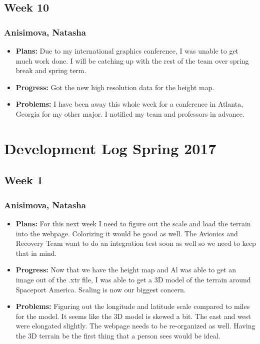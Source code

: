 \documentclass[10pt,draftclsnofoot,onecolumn]{IEEEtran}
\begin{document}
\subsection{Week 10}
\subsubsection{Anisimova, Natasha}
\begin{itemize}
	\item \textbf{Plans: }
	Due to my international graphics conference, I was unable to get much work done. I will be catching up with the rest of the team over spring break and spring term.
	\item \textbf{Progress: }
	Got the new high resolution data for the height map.

	\item \textbf{Problems: }
	I have been away this whole week for a conference in Atlanta, Georgia for my other major. I notified my team and professors in advance.
\end{itemize}

\section{Development Log Spring 2017}


\subsection{Week 1}
\subsubsection{Anisimova, Natasha}
\begin{itemize}
	\item \textbf{Plans: }
	For this next week I need to figure out the scale and load the terrain into the webpage. Colorizing it would be good as well. The Avionics and Recovery Team want to do an integration test soon as well so we need to keep that in mind.
	\item \textbf{Progress: }
	Now that we have the height map and Al was able to get an image out of the .xtr file, I was able to get a 3D model of the 	terrain around Spaceport America. Scaling is now our biggest concern.
	\item \textbf{Problems: }
	Figuring out the longitude and latitude scale compared to miles for the model. It seems like the 3D model is skewed a bit. The east and west were elongated slightly. The webpage needs to be re-organized as well. Having the 3D terrain be the first thing that a person sees would be ideal.
\end{itemize}
\end{document}
